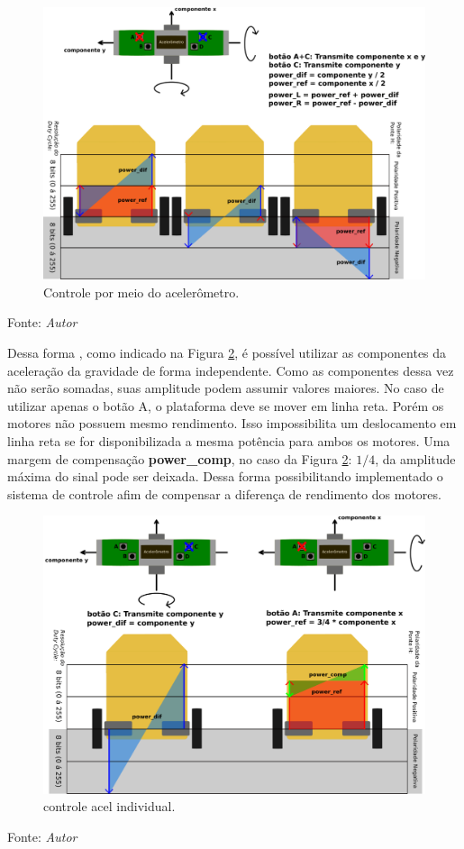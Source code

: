 \begin{figure}[!htb]
  \centering
  \caption{Controle por meio do acelerômetro.}
  \label{fig:controle_acel}
  \includegraphics[width=1\textwidth]{./img/projeto/controle_acel.png}
\end{figure}
Fonte: \textit{Autor}

\pagebreak

Dessa forma , como indicado na Figura \ref{fig:controle_acel_individual}, é possível utilizar as componentes da aceleração da gravidade de forma independente. Como as componentes dessa vez não serão somadas, suas amplitude podem assumir valores maiores. No caso de utilizar apenas o botão A, o plataforma deve se mover em linha reta. 
Porém os motores não possuem mesmo rendimento.
Isso impossibilita um deslocamento em linha reta se for disponibilizada a mesma potência para ambos os motores. 
Uma margem de compensação \textbf{power\_comp}, no caso da Figura \ref{fig:controle_acel_individual}: $1/4$, da amplitude máxima do sinal pode ser deixada.
Dessa forma possibilitando implementado o sistema de controle afim de compensar a diferença de rendimento dos motores.

\begin{figure}[!htb]
  \centering
  \caption{controle acel individual.}
  \label{fig:controle_acel_individual}
  \includegraphics[width=1\textwidth]{./img/projeto/controle_acel_individual.png}
\end{figure}
Fonte: \textit{Autor}

